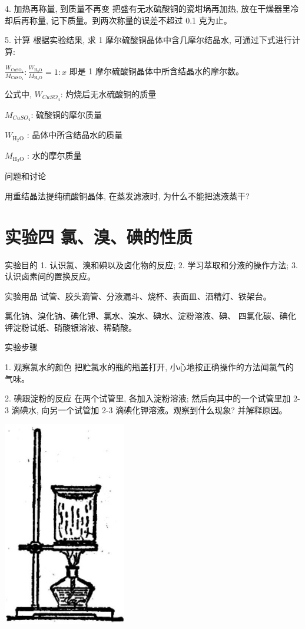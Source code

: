 \documentclass[10pt]{article}
\begin{document}
4. 加热再称量, 到质量不再变 把盛有无水硫酸铜的瓷坩埚再加热, 放在干燥器里冷却后再称量, 记下质量。到两次称量的误差不超过 0.1 克为止。

5. 计算 根据实验结果, 求 1 摩尔硫酸铜晶体中含几摩尔结晶水, 可通过下式进行计算:

\(\frac{{W}_{\mathrm{{Cu}}{\mathrm{{SO}}}_{4}}}{{M}_{\mathrm{{Cu}}{\mathrm{{SO}}}_{4}}} : \frac{{W}_{{\mathrm{H}}_{3}\mathrm{O}}}{{M}_{{\mathrm{H}}_{3}\mathrm{O}}} = 1 : x\) 即是 1 摩尔硫酸铜晶体中所含结晶水的摩尔数。

公式中, \({W}_{CuSO_{4}}\): 灼烧后无水硫酸铜的质量

\({M}_{CuSO_{4}} \): 硫酸铜的摩尔质量

\({W}_{{\mathrm{H}}_{2}\mathrm{O} }\) : 晶体中所含结晶水的质量

\({M}_{{\mathrm{H}}_{2}\mathrm{O} }\) : 水的摩尔质量

问题和讨论

用重结晶法提纯硫酸铜晶体, 在蒸发滤液时, 为什么不能把滤液蒸干?

\section*{实验四 氯、溴、碘的性质}

实验目的 1. 认识氯、溴和碘以及卤化物的反应; 2. 学习萃取和分液的操作方法; 3. 认识卤素间的置换反应。

实验用品 试管、胶头滴管、分液漏斗、烧杯、表面皿、酒精灯、铁架台。

氯化钠、溴化钠、碘化钾、氯水、溴水、碘水、淀粉溶液、碘、 四氯化碳、碘化钾淀粉试纸、硝酸银溶液、稀硝酸。

实验步骤

1. 观察氯水的颜色 把贮氯水的瓶的瓶盖打开, 小心地按正确操作的方法闻氯气的气味。

2. 碘跟淀粉的反应 在两个试管里, 各加入淀粉溶液; 然后向其中的一个试管里加 2-3 滴碘水, 向另一个试管加 2-3 滴碘化钾溶液。观察到什么现象? 并解释原因。

\begin{center}
\includegraphics[max width=0.4\textwidth]{images/01912d0f-097c-7e75-8f32-4f326cd86c9f_159_789678.jpg}
\end{center}
\end{document}
